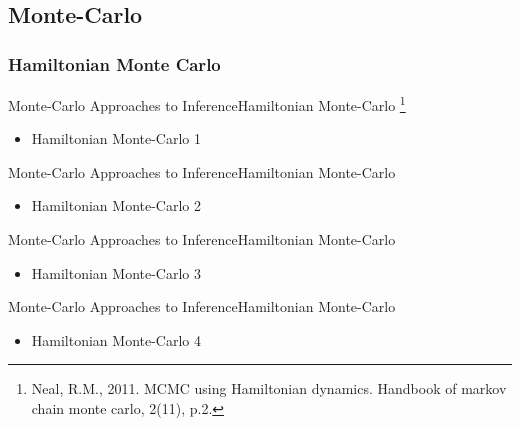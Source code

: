\documentclass[AERbeamer%
              ,optEnglish%
              ,optBiber%
              ,optBibstyleAlphabetic%
              ,optBeamerClassicFormat%
              ]{AERlatex}%
\begin{document}
\subsection{Monte-Carlo}


\subsubsection*{Hamiltonian Monte Carlo}
\begin{frame}[c]{Monte-Carlo Approaches to Inference}{Hamiltonian Monte-Carlo \footnote{Neal, R.M., 2011. MCMC using Hamiltonian dynamics. Handbook of markov chain monte carlo, 2(11), p.2.}}
    \centering
    \begin{itemize}
        \item Hamiltonian Monte-Carlo 1
    \end{itemize}
\end{frame}


\begin{frame}[c]{Monte-Carlo Approaches to Inference}{Hamiltonian Monte-Carlo}
    \centering
    \begin{itemize}
        \item Hamiltonian Monte-Carlo 2
    \end{itemize}
\end{frame}


\begin{frame}[c]{Monte-Carlo Approaches to Inference}{Hamiltonian Monte-Carlo}
    \centering
    \begin{itemize}
        \item Hamiltonian Monte-Carlo 3
    \end{itemize}
\end{frame}


\begin{frame}[c]{Monte-Carlo Approaches to Inference}{Hamiltonian Monte-Carlo}
    \centering
    \begin{itemize}
        \item Hamiltonian Monte-Carlo 4
    \end{itemize}
\end{frame}
\end{document}
